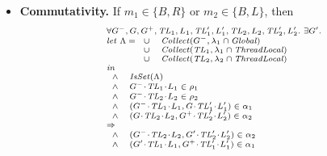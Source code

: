 \begin{itemize}
\item {\bf Commutativity.}
If $m_1 \in \{B,R\}$ or $m_2 \in \{B,L\}$, then 
\[
\scriptsize{
\begin{array}{l}
\forall \varsG^-,\varsG,\varsG^+,\varsTL_1,\varsL_1,\varsTL'_1,\varsL'_1,\varsTL_2,\varsL_2,\varsTL'_2,\varsL'_2.\ \exists \varsG'. \\
\mathit{let}\ \Lambda =
\begin{array}[t]{ll}
\cup & \Collect(\varsG^-, \lins_1 \cap \Global) \\
\cup & \Collect(\varsTL_1, \lins_1 \cap \ThreadLocal) \\
\cup & \Collect(\varsTL_2, \lins_2 \cap \ThreadLocal) 
\end{array} \\
\mathit{in} \\
\begin{array}{ll}
\wedge & \IsSet(\Lambda) \\
\wedge & \MakeStore{\varsG^-}{\varsTL_1}{\varsL_1} \in \rho_1 \\
\wedge & \MakeStore{\varsG^-}{\varsTL_2}{\varsL_2} \in \rho_2 \\
\wedge & (\MakeStore{\varsG^-}{\varsTL_1}{\varsL_1},\MakeStore{\varsG}{\varsTL'_1}{\varsL'_1}) \in \alpha_1 \\
\wedge & (\MakeStore{\varsG}{\varsTL_2}{\varsL_2},\MakeStore{\varsG^+}{\varsTL'_2}{\varsL'_2}) \in \alpha_2 \\
\end{array} \\
\Rightarrow \\
\begin{array}{ll}
\wedge & (\MakeStore{\varsG^-}{\varsTL_2}{\varsL_2},\MakeStore{\varsG'}{\varsTL'_2}{\varsL'_2}) \in \alpha_2 \\
\wedge & (\MakeStore{\varsG'}{\varsTL_1}{\varsL_1},\MakeStore{\varsG^+}{\varsTL'_1}{\varsL'_1}) \in \alpha_1 \\
\end{array}
\end{array}
}
\]


\end{itemize}
